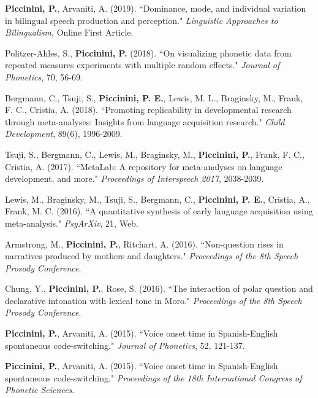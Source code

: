 \documentclass[9pt]{article}
\newenvironment{changemargin}[2]{%
  \begin{list}{}{%
    \setlength{\topsep}{0pt}%
    \setlength{\leftmargin}{#1}%
    \setlength{\rightmargin}{#2}%
    \setlength{\listparindent}{\parindent}%
    \setlength{\itemindent}{\parindent}%
    \setlength{\parsep}{\parskip}%
  }%
  \item[]}{\end{list}
}
\newenvironment{body} {
	\vspace*{-16pt}
	\begin{changemargin}{-0.25in}{-0.5in}
  }	
	{\end{changemargin}
}
\begin{document}
\begin{body}
	\vspace{14pt}
	
	\textbf{Piccinini, P.}, Arvaniti, A. (2019). ``Dominance, mode, and individual variation in bilingual speech production and perception." \emph{Linguistic Approaches to Bilingualism}, Online First Article.\\
	\medskip
	
	Politzer-Ahles, S., \textbf{Piccinini, P.} (2018). ``On visualizing phonetic data from repeated measures experiments with multiple random effects." \emph{Journal of Phonetics}, 70, 56-69.\\
	\medskip
	
	Bergmann, C., Tsuji, S., \textbf{Piccinini, P. E.},  Lewis, M. L.,  Braginsky, M., Frank, F. C., Cristia, A. (2018). ``Promoting replicability in developmental research through meta-analyses: Insights from language acquisition research." \emph{Child Development}, 89(6), 1996-2009.\\
	\medskip
	
	Tsuji, S., Bergmann, C., Lewis, M.,  Braginsky, M.,  \textbf{Piccinini, P.},  Frank, F. C., Cristia, A. (2017). ``MetaLab: A repository for meta-analyses on language development, and more." 	\emph{Proceedings of Interspeech 2017}, 2038-2039.\\
	\medskip
	
	Lewis, M., Braginsky, M., Tsuji, S., Bergmann, C., \textbf{Piccinini, P. E.}, Cristia, A., Frank, M. C. (2016). ``A quantitative synthesis of early language acquisition using meta-analysis." \emph{PsyArXiv}, 21, Web.\\
	\medskip
		
	Armstrong, M., \textbf{Piccinini, P.}, Ritchart, A. (2016). ``Non-question rises in narratives produced by mothers and daughters." \emph{Proceedings of the 8th Speech Prosody Conference}.\\
	\medskip
	
	Chung, Y., \textbf{Piccinini, P.}, Rose, S. (2016). ``The interaction of polar question and declarative intonation with lexical tone in Moro." \emph{Proceedings of the 8th Speech Prosody Conference}.\\
	\medskip

	\textbf{Piccinini, P.}, Arvaniti, A. (2015). ``Voice onset time in Spanish-English spontaneous code-switching." \emph{Journal of Phonetics}, 52, 121-137.\\
	\medskip

	\textbf{Piccinini, P.}, Arvaniti, A. (2015). ``Voice onset time in Spanish-English spontaneous code-switching." \emph{Proceedings of the 18th International Congress of Phonetic Sciences}.\\
	\medskip
	

\end{body}
\end{document}
